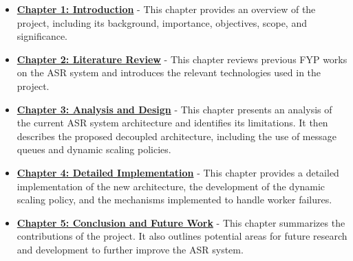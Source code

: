 \begin{itemize}
    \item \hyperref[chapter:introduction]{\textbf{Chapter 1: Introduction}} - This chapter provides an overview of the project, including its background, importance, objectives, scope, and significance.
    
    \item \hyperref[chapter:literature_review]{\textbf{Chapter 2: Literature Review}} - This chapter reviews previous FYP works on the ASR system and introduces the relevant technologies used in the project.
    
    \item \hyperref[chapter:analysis_and_design]{\textbf{Chapter 3: Analysis and Design}} - This chapter presents an analysis of the current ASR system architecture and identifies its limitations. It then describes the proposed decoupled architecture, including the use of message queues and dynamic scaling policies.
    
    \item \hyperref[chapter:detailed_implementation]{\textbf{Chapter 4: Detailed Implementation}} - This chapter provides a detailed implementation of the new architecture, the development of the dynamic scaling policy, and the mechanisms implemented to handle worker failures.
    
    \item \hyperref[chapter:conclusion_and_future_work]{\textbf{Chapter 5: Conclusion and Future Work}} - This chapter summarizes the contributions of the project. It also outlines potential areas for future research and development to further improve the ASR system.
\end{itemize}

